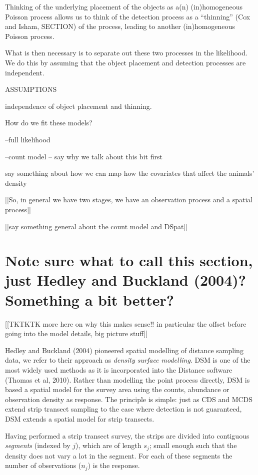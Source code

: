 \documentclass[useAMS,referee]{biom}
\begin{document}
Thinking of the underlying placement of the objects as a(n) (in)homogeneous Poisson process allows us to think of the detection process as a ``thinning'' (Cox and Isham, SECTION) of the process, leading to another (in)homogeneous Poisson process. 

What is then necessary is to separate out these two processes in the likelihood. We do this by assuming that the object placement and detection processes are independent. 


ASSUMPTIONS

independence of object placement and thinning.

How do we fit these models?

--full likelihood

--count model -- say why we talk about this bit first


say something about how we can map how the covariates that affect the animals' density


[[So, in general we have two stages, we have an observation process and a spatial process]]

[[say something general about the count model and DSpat]]




\section{Note sure what to call this section, just Hedley and Buckland (2004)? Something a bit better?}
\label{s:countmodel}

[[TKTKTK more here on why this makes sense!! in particular the offset before going into the model details, big picture stuff]]

Hedley and Buckland (2004) pioneered spatial modelling of distance sampling data, we refer to their approach as \textit{density surface modelling}. DSM is one of the most widely used methods as it is incorporated into the Distance software (Thomas et al, 2010). Rather than modelling the point process directly, DSM is based a spatial model for the survey area using the counts, abundance or observation density as response. The principle is simple: just as CDS and MCDS extend strip transect sampling to the case where detection is not guaranteed, DSM extends a spatial model for strip transects.

Having performed a strip transect survey, the strips are divided into contiguous \textit{segments} (indexed by $j$), which are of length $s_j$; small enough such that the density does not vary a lot in the segment. For each of these segments the number of observations ($n_j$) is the response.
\end{document}
